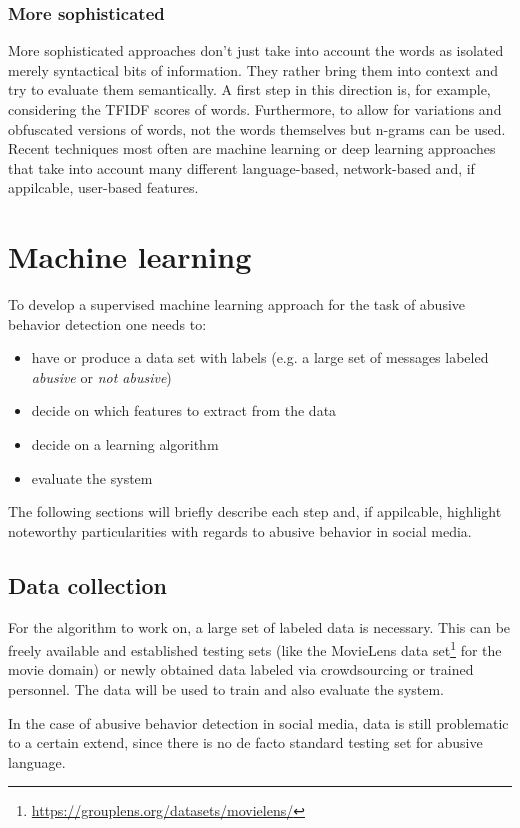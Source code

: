 \documentclass{proseminar}
\begin{document}
\subsubsection{More sophisticated} More sophisticated approaches don't just take into account the words as isolated merely syntactical bits of information. They rather bring them into context and try to evaluate them semantically. A first step in this direction is, for example, considering the TFIDF scores of words. Furthermore, to allow for variations and obfuscated versions of words, not the words themselves but n-grams can be used\cite{Yin:2009}. Recent techniques most often are machine learning\cite{Yahoo:2016}\cite{Twitter:2017} or deep learning\cite{DeepLearning:2017} approaches that take into account many different language-based, network-based and, if appilcable, user-based features.

\section{Machine learning}
To develop a supervised machine learning approach for the task of abusive behavior detection one needs to:
\begin{itemize}
\item have or produce a data set with labels (e.g. a large set of messages labeled \emph{abusive} or \emph{not abusive})
\item decide on which features to extract from the data
\item decide on a learning algorithm
\item evaluate the system
\end{itemize}
The following sections will briefly describe each step and, if appilcable, highlight noteworthy particularities with regards to abusive behavior in social media.

\subsection{Data collection}
For the algorithm to work on, a large set of labeled data is necessary. This can be freely available and established testing sets (like the MovieLens data set\footnote{\url{https://grouplens.org/datasets/movielens/}} for the movie domain) or newly obtained data labeled via crowdsourcing or trained personnel. The data will be used to train and also evaluate the system.

In the case of abusive behavior detection in social media, data is still problematic to a certain extend, since there is no de facto standard testing set for abusive language\cite{Yahoo:2016}.
\end{document}
